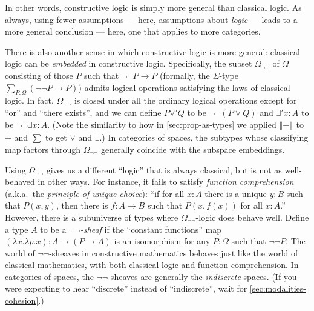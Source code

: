 \documentclass[12pt]{article}
\numberwithin{equation}{section}
\newcommand{\trunc}[2]{\mathopen{}\left\Vert #2\right\Vert_{#1}\mathclose{}}
\newcommand{\brck}[1]{\trunc{}{#1}}
\begin{document}
In other words, constructive logic is simply {more general} than classical logic.
As always, using fewer assumptions --- here, assumptions about \emph{logic} --- leads to a more general conclusion --- here, one that applies to more categories.

There is also another sense in which constructive logic is more general: classical logic can be \emph{embedded} in constructive logic.
Specifically, the subset $\Omega_{\neg\neg}$ of $\Omega$ consisting of those $P$ such that $\neg\neg P \to P$ (formally, the $\Sigma$-type $\sum_{P:\Omega} (\neg\neg P\to P)$) admits logical operations satisfying the laws of classical logic.
In fact, $\Omega_{\neg\neg}$ is closed under all the ordinary logical operations except for ``or'' and ``there exists'', and we can define $P\mathbin{\lor'} Q$ to be $\neg\neg(P\lor Q)$ and $\exists' x:A$ to be $\neg\neg \exists x:A$.
(Note the similarity to how in \cref{sec:prop-as-types} we applied $\brck{-}$ to $+$ and $\sum$ to get $\lor$ and $\exists$.)
In categories of spaces, the subtypes whose classifying map factors through $\Omega_{\neg\neg}$ generally coincide with the subspace embeddings.

Using $\Omega_{\neg\neg}$ gives us a different ``logic'' that is always classical, but is not as well-behaved in other ways.
For instance, it fails to satisfy \emph{function comprehension} (a.k.a.\ the \emph{principle of unique choice}): ``if for all $x:A$ there is a unique $y:B$ such that $P(x,y)$, then there is $f:A\to B$ such that $P(x,f(x))$ for all $x:A$.''
However, there is a subuniverse of types where $\Omega_{\neg\neg}$-logic does behave well.
Define a type $A$ to be a \emph{$\neg\neg$-sheaf} if the ``constant functions'' map $(\lambda x.\lambda p.x):A \to (P\to A)$ is an isomorphism for any $P:\Omega$ such that $\neg\neg P$.
The world of $\neg\neg$-sheaves in constructive mathematics behaves just like the world of classical mathematics, with both classical logic and function comprehension.
In categories of spaces, the $\neg\neg$-sheaves are generally the \emph{indiscrete} spaces.
(If you were expecting to hear ``discrete'' instead of ``indiscrete'', wait for \cref{sec:modalities-cohesion}.)
\end{document}
